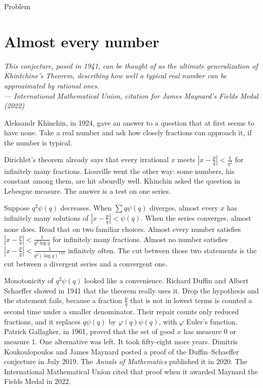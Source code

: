 \begin{exname}Problem\end{exname}
\renewcommand{\ocExName}{Problem}
\chapter{Almost every number}\label{ch:harder}

\begin{center}\itshape
This conjecture, posed in 1941, can be thought of as the ultimate generalization of Khintchine's Theorem, describing how well a
typical real number can be approximated by rational ones.\\
\upshape --- International Mathematical Union, citation for James Maynard's Fields Medal (2022)
\end{center}

Aleksandr Khinchin, in 1924, gave an answer to a question that at first seems to have none. Take a real number and ask how closely fractions can approach it, if the number is typical.

Dirichlet's theorem already says that every irrational $x$ meets $|x-\frac pq|<\frac1{q^2}$ for infinitely many fractions. Liouville went the other way: some numbers, his constant among them, are hit absurdly well. Khinchin asked the question in Lebesgue measure. The answer is a test on one series.

Suppose $q^2\psi(q)$ decreases. When $\sum q\psi(q)$ diverges, almost every $x$ has infinitely many solutions of $|x-\frac pq|<\psi(q)$. When the series converges, almost none does. Read that on two familiar choices. Almost every number satisfies $|x-\frac pq|<\frac1{q^2\log q}$ for infinitely many fractions. Almost no number satisfies $|x-\frac pq|<\frac1{q^2(\log q)^{1.01}}$ infinitely often. The cut between those two statements is the cut between a divergent series and a convergent one.

Monotonicity of $q^2\psi(q)$ looked like a convenience. Richard Duffin and Albert Schaeffer showed in 1941 that the theorem really uses it. Drop the hypothesis and the statement fails, because a fraction $\frac pq$ that is not in lowest terms is counted a second time under a smaller denominator. Their repair counts only reduced fractions, and it replaces $q\psi(q)$ by $\varphi(q)\psi(q)$, with $\varphi$ Euler's function. Patrick Gallagher, in 1961, proved that the set of good $x$ has measure $0$ or measure $1$. One alternative was left. It took fifty-eight more years. Dimitris Koukoulopoulos and James Maynard posted a proof of the Duffin--Schaeffer conjecture in July 2019. The \emph{Annals of Mathematics} published it in 2020. The International Mathematical Union cited that proof when it awarded Maynard the Fields Medal in 2022.

